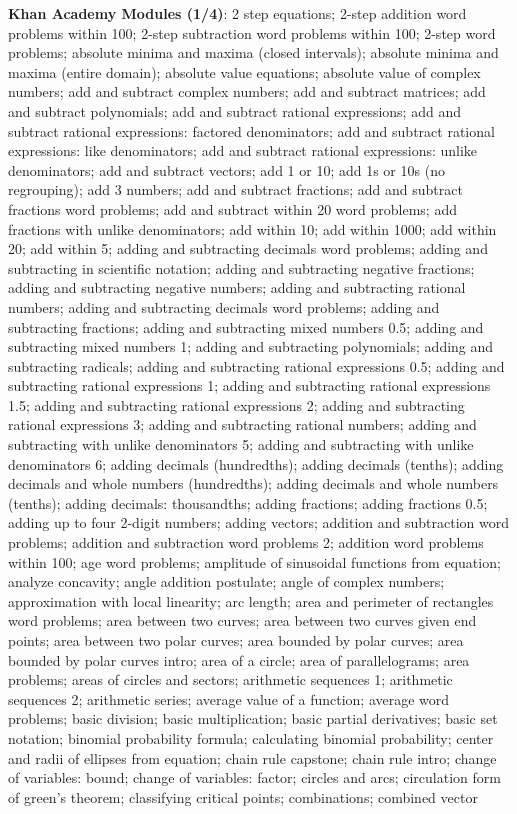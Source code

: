 \documentclass{article}
\begin{document}
\begin{enumerate}
\end{enumerate}

\begin{figure*}
\textbf{Khan Academy Modules (1/4)}:
2 step equations; 2-step addition word problems within 100; 2-step subtraction word problems within 100; 2-step word problems; absolute minima and maxima (closed intervals); absolute minima and maxima (entire domain); absolute value equations; absolute value of complex numbers; add and subtract complex numbers; add and subtract matrices; add and subtract polynomials; add and subtract rational expressions; add and subtract rational expressions: factored denominators; add and subtract rational expressions: like denominators; add and subtract rational expressions: unlike denominators; add and subtract vectors; add 1 or 10; add 1s or 10s (no regrouping); add 3 numbers; add and subtract fractions; add and subtract fractions word problems; add and subtract within 20 word problems; add fractions with unlike denominators; add within 10; add within 1000; add within 20; add within 5; adding and subtracting decimals word problems; adding and subtracting in scientific notation; adding and subtracting negative fractions; adding and subtracting negative numbers; adding and subtracting rational numbers; adding and subtracting decimals word problems; adding and subtracting fractions; adding and subtracting mixed numbers 0.5; adding and subtracting mixed numbers 1; adding and subtracting polynomials; adding and subtracting radicals; adding and subtracting rational expressions 0.5; adding and subtracting rational expressions 1; adding and subtracting rational expressions 1.5; adding and subtracting rational expressions 2; adding and subtracting rational expressions 3; adding and subtracting rational numbers; adding and subtracting with unlike denominators 5; adding and subtracting with unlike denominators 6; adding decimals (hundredths); adding decimals (tenths); adding decimals and whole numbers (hundredths); adding decimals and whole numbers (tenths); adding decimals: thousandths; adding fractions; adding fractions 0.5; adding up to four 2-digit numbers; adding vectors; addition and subtraction word problems; addition and subtraction word problems 2; addition word problems within 100; age word problems; amplitude of sinusoidal functions from equation; analyze concavity; angle addition postulate; angle of complex numbers; approximation with local linearity; arc length; area and perimeter of rectangles word problems; area between two curves; area between two curves given end points; area between two polar curves; area bounded by polar curves; area bounded by polar curves intro; area of a circle; area of parallelograms; area problems; areas of circles and sectors; arithmetic sequences 1; arithmetic sequences 2; arithmetic series; average value of a function; average word problems; basic division; basic multiplication; basic partial derivatives; basic set notation; binomial probability formula; calculating binomial probability; center and radii of ellipses from equation; chain rule capstone; chain rule intro; change of variables: bound; change of variables: factor; circles and arcs; circulation form of green's theorem; classifying critical points; combinations; combined vector 
\end{figure*}
\end{document}
